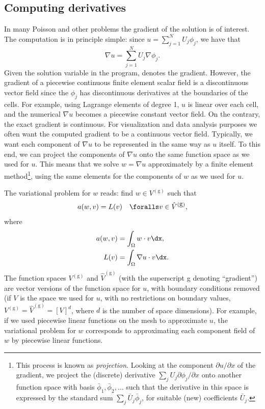 \subsection{Computing derivatives}
\label{langtangen:poisson:gradu}

In many Poisson and other problems the gradient of the solution is of
interest. The computation is in principle simple: since $u = \sum_{j=1}^N
U_j \phi_j$, we have that
\begin{equation}
  \nabla u = \sum_{j=1}^N U_j \nabla \phi_j.
\end{equation}
Given the solution variable  in the program,  denotes
the gradient. However, the gradient of a piecewise continuous finite
element scalar field is a discontinuous vector field since the $\phi_j$
has discontinuous derivatives at the boundaries of the cells. For example,
using Lagrange elements of degree 1, $u$ is linear over each cell, and
the numerical $\nabla u$ becomes a piecewise constant vector field. On
the contrary, the exact gradient is continuous.  For visualization
and data analysis purposes we often want the computed gradient to be a
continuous vector field. Typically, we want each component of $\nabla
u$ to be represented in the same way as $u$ itself. To this end,
we can project the components of $\nabla u$ onto the same function
space as we used for $u$.  This means that we solve $w = \nabla u$
approximately by a finite element method\footnote{This process is known as
\emph{projection}.  Looking at the component $\partial
u/\partial x$ of the gradient, we project the (discrete) derivative
$\sum_jU_j{\partial \phi_j/\partial x}$ onto another function space
with basis $\bar\phi_1,\bar\phi_2,\ldots$ such that the derivative in
this space is expressed by the standard sum $\sum_j\bar U_j\bar \phi_j$,
for suitable (new) coefficients $\bar U_j$.}, using the same elements
for the components of $w$ as we used for $u$.

The variational problem for $w$ reads: find $w\in V^{(\mbox{g})}$ such that
\begin{equation}
  a(w, v) = L(v)\quad\foralls v\in \hat{V}^{(\mbox{g})},
\end{equation}
where
\begin{align}
  a(w, v) &= \int_\Omega w\cdot v\dx,
\\
  L(v) &= \int_\Omega \nabla u\cdot v\dx.
\end{align}
The function spaces $V^{(\mbox{g})}$ and $\hat{V}^{(\mbox{g})}$ (with the superscript g denoting
``gradient'') are vector versions of the function space for $u$, with
boundary conditions removed (if $V$ is the space we used for $u$, with
no restrictions on boundary values, $ V^{(\mbox{g})} = \hat{V}^{(\mbox{g})} = [V]^d$, where $d$
is the number of space dimensions).  For example, if we used piecewise
linear functions on the mesh to approximate $u$, the variational problem
for $w$ corresponds to approximating each component field of $w$ by
piecewise linear functions.


